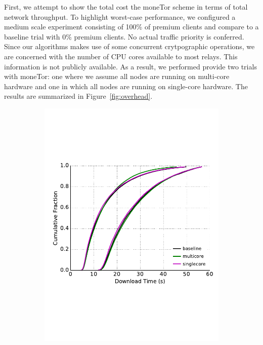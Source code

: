 First, we attempt to show the total cost the moneTor scheme in terms of total
network throughput. To highlight worst-case performance, we configured a medium
scale experiment consisting of 100\% of premium clients and compare to a
baseline trial with 0\% premium clients. No actual traffic priority is
conferred. Since our algorithms makes use of some concurrent crytpographic
operations, we are concerned with the number of CPU cores available to most
relays. This information is not publicly available. As a result, we performed
provide two trials with moneTor: one where we assume all nodes are running on
multi-core hardware and one in which all nodes are running on single-core
hardware. The results are summarized in Figure~\ref{fig:overhead}.

\begin{figure} \centering
	\begin{subfigure}[t]{0.32\textwidth} \centering
\includegraphics[trim={0 3cm 0 3cm}, clip, width=1.0\textwidth]{images/overhead_downloadtime.pdf}

\end{subfigure}
\end{figure}
